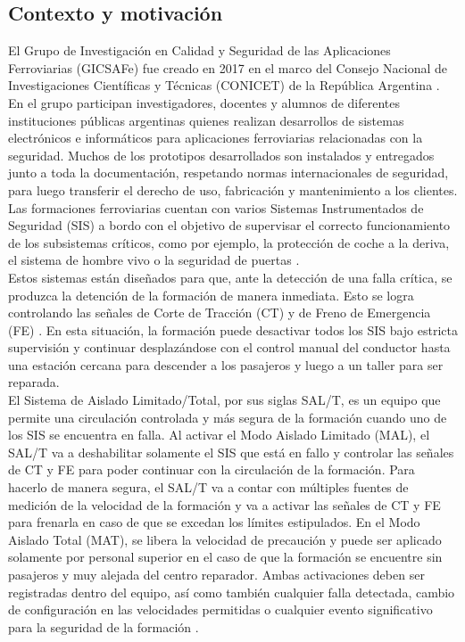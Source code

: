 



\subsection{Contexto y motivación}

El Grupo de Investigación en Calidad y Seguridad de las Aplicaciones Ferroviarias (GICSAFe) fue creado en 2017 en el marco del Consejo Nacional de Investigaciones Científicas y Técnicas (CONICET) de la República Argentina \cite{gicsafe}. En el grupo participan investigadores, docentes y alumnos de diferentes instituciones públicas argentinas quienes realizan desarrollos de sistemas electrónicos e informáticos para aplicaciones ferroviarias relacionadas con la seguridad. Muchos de los prototipos desarrollados son instalados y entregados junto a toda la documentación, respetando normas internacionales de seguridad, para luego transferir el derecho de uso, fabricación y mantenimiento a los clientes. \\

Las formaciones ferroviarias cuentan con varios Sistemas Instrumentados de Seguridad (SIS) a bordo con el objetivo de supervisar el correcto funcionamiento de los subsistemas críticos, como por ejemplo, la protección de coche a la deriva, el sistema de hombre vivo o la seguridad de puertas \cite{salt_paper}. \\

Estos sistemas están diseñados para que, ante la detección de una falla crítica, se produzca la detención de la formación de manera inmediata. Esto se logra controlando las señales de Corte de Tracción (CT) y de Freno de Emergencia (FE) \cite{salt_paper}. En esta situación, la formación puede desactivar todos los SIS bajo estricta supervisión y continuar desplazándose con el control manual del conductor hasta una estación cercana para descender a los pasajeros y luego a un taller para ser reparada. \\

El Sistema de Aislado Limitado/Total, por sus siglas SAL/T, es un equipo que permite una circulación controlada y más segura de la formación cuando uno de los SIS se encuentra en falla. Al activar el Modo Aislado Limitado (MAL), el SAL/T va a deshabilitar solamente el SIS que está en fallo y controlar las señales de CT y FE para poder continuar con la circulación de la formación. Para hacerlo de manera segura, el SAL/T va a contar con múltiples fuentes de medición de la velocidad de la formación y va a activar las señales de CT y FE para frenarla en caso de que se excedan los límites estipulados. En el Modo Aislado Total (MAT), se libera la velocidad de precaución y puede ser aplicado solamente por personal superior en el caso de que la formación se encuentre sin pasajeros y muy alejada del centro reparador. Ambas activaciones deben ser registradas dentro del equipo, así como también cualquier falla detectada, cambio de configuración en las velocidades permitidas o cualquier evento significativo para la seguridad de la formación \cite{salt_paper}.\\


